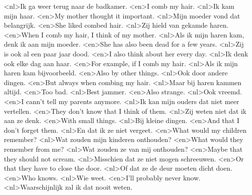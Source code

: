 <nl>Ik ga weer terug naar de badkamer.
<en>I comb my hair.
<nl>Ik kam mijn haar.
<en>My mother thought it important.
<nl>Mijn moeder vond dat belangrijk.
<en>She liked combed hair.
<nl>Zij hield van gekamde haren.
<en>When I comb my hair, I think of my mother.
<nl>Als ik mijn haren kam, denk ik aan mijn moeder.
<en>She has also been dead for a few years.
<nl>Zij is ook al een paar jaar dood.
<en>I also think about her every day.
<nl>Ik denk ook elke dag aan haar.
<en>For example, if I comb my hair.
<nl>Als ik mijn haren kam bijvoorbeeld.
<en>Also by other things.
<nl>Ook door andere dingen.
<en>But always when combing my hair.
<nl>Maar bij haren kammen altijd.
<en>Too bad.
<nl>Best jammer.
<en>Also strange.
<nl>Ook vreemd.
<en>I cann't tell my parents anymore.
<nl>Ik kan mijn ouders dat niet meer vertellen.
<en>They don't know that I think of them.
<nl>Zij weten niet dat ik aan ze denk.
<en>With small things.
<nl>Bij kleine dingen.
<en>And that I don't forget them.
<nl>En dat ik ze niet vergeet.
<en>What would my children remember?
<nl>Wat zouden mijn kinderen onthouden?
<en>What would they remember from me?
<nl>Wat zouden ze van mij onthouden?
<en>Maybe that they should not scream.
<nl>Misschien dat ze niet mogen schreeuwen.
<en>Or that they have to close the door.
<nl>Of dat ze de deur moeten dicht doen.
<en>Who knows.
<nl>Wie weet.
<en>I'll probably never know.
<nl>Waarschijnlijk zal ik dat nooit weten.
